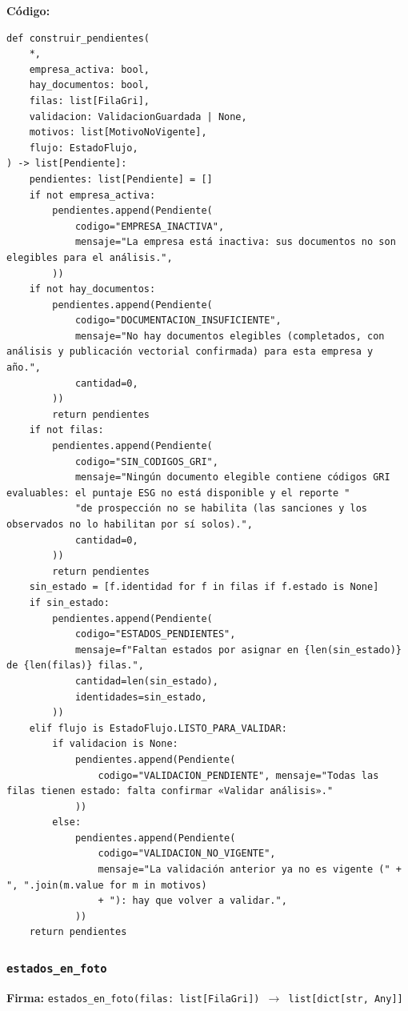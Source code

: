 \documentclass[11pt,a4paper]{article}
\begin{document}
\textbf{Código:}
\begin{lstlisting}
def construir_pendientes(
    *,
    empresa_activa: bool,
    hay_documentos: bool,
    filas: list[FilaGri],
    validacion: ValidacionGuardada | None,
    motivos: list[MotivoNoVigente],
    flujo: EstadoFlujo,
) -> list[Pendiente]:
    pendientes: list[Pendiente] = []
    if not empresa_activa:
        pendientes.append(Pendiente(
            codigo="EMPRESA_INACTIVA",
            mensaje="La empresa está inactiva: sus documentos no son elegibles para el análisis.",
        ))
    if not hay_documentos:
        pendientes.append(Pendiente(
            codigo="DOCUMENTACION_INSUFICIENTE",
            mensaje="No hay documentos elegibles (completados, con análisis y publicación vectorial confirmada) para esta empresa y año.",
            cantidad=0,
        ))
        return pendientes
    if not filas:
        pendientes.append(Pendiente(
            codigo="SIN_CODIGOS_GRI",
            mensaje="Ningún documento elegible contiene códigos GRI evaluables: el puntaje ESG no está disponible y el reporte "
            "de prospección no se habilita (las sanciones y los observados no lo habilitan por sí solos).",
            cantidad=0,
        ))
        return pendientes
    sin_estado = [f.identidad for f in filas if f.estado is None]
    if sin_estado:
        pendientes.append(Pendiente(
            codigo="ESTADOS_PENDIENTES",
            mensaje=f"Faltan estados por asignar en {len(sin_estado)} de {len(filas)} filas.",
            cantidad=len(sin_estado),
            identidades=sin_estado,
        ))
    elif flujo is EstadoFlujo.LISTO_PARA_VALIDAR:
        if validacion is None:
            pendientes.append(Pendiente(
                codigo="VALIDACION_PENDIENTE", mensaje="Todas las filas tienen estado: falta confirmar «Validar análisis»."
            ))
        else:
            pendientes.append(Pendiente(
                codigo="VALIDACION_NO_VIGENTE",
                mensaje="La validación anterior ya no es vigente (" + ", ".join(m.value for m in motivos)
                + "): hay que volver a validar.",
            ))
    return pendientes
\end{lstlisting}

\subsubsection*{\texttt{estados\_en\_foto}}
\textbf{Firma:} \texttt{estados\_en\_foto(filas: list[FilaGri]) $\rightarrow$ list[dict[str, Any]]}
\end{document}
